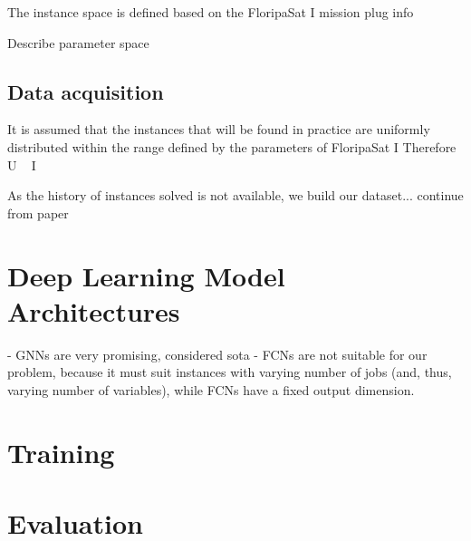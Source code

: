 The instance space is defined based on the FloripaSat I mission
    plug info

Describe parameter space

\subsection{Data acquisition}

It is assumed that the instances that will be found in practice are uniformly distributed within the range defined by the parameters of FloripaSat I
Therefore U ~ I

As the history of instances solved is not available, we build our dataset...
    continue from paper

\section{Deep Learning Model Architectures}

- GNNs are very promising, considered sota
- FCNs are not suitable for our problem, because it must suit instances with varying number of jobs (and, thus, varying number of variables), while FCNs have a fixed output dimension.

\section{Training}

\section{Evaluation}

